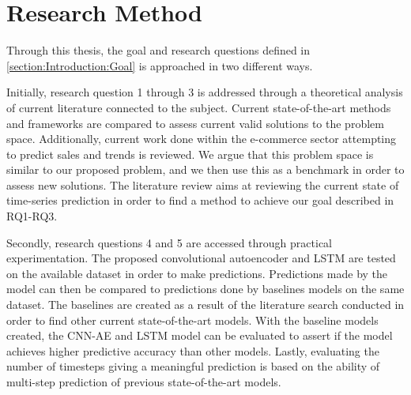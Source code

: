 \section{Research Method}
\label{section:Introduction:research-method}

Through this thesis, the goal and research questions defined in \autoref{section:Introduction:Goal} is approached in two different ways.

Initially, research question 1 through 3 is addressed through a theoretical analysis of current literature connected to the subject.
Current state-of-the-art methods and frameworks are compared to assess current valid solutions to the problem space.
Additionally, current work done within the e-commerce sector attempting to predict sales and trends is reviewed.
We argue that this problem space is similar to our proposed problem, and we then use this as a benchmark in order to assess new solutions.
The literature review aims at reviewing the current state of time-series prediction in order to find a method to achieve our goal described in RQ1-RQ3.

Secondly, research questions 4 and 5 are accessed through practical experimentation.
The proposed convolutional autoencoder and LSTM are tested on the available dataset in order to make predictions.
Predictions made by the model can then be compared to predictions done by baselines models on the same dataset.
The baselines are created as a result of the literature search conducted in order to find other current state-of-the-art models.
With the baseline models created, the CNN-AE and LSTM model can be evaluated to assert if the model achieves higher predictive accuracy than other models.
Lastly, evaluating the number of timesteps giving a meaningful prediction is based on the ability of multi-step prediction of previous state-of-the-art models.



\iffalse
This paper approaches the goal and research questions through theoretical analysis
of the problem space.
Primarily the focus of this paper is to conduct a review and analysis of current literature.
Reviewing the current state-of-the-art methods for predictive analysis of time-series,
as well as new experimental methods and frameworks.
Additionally, we review the current work done within the E-commerce sector attempting to predict sales and trends.
We argue that this problem space is similar to our proposed problem, and we thus use this as a benchmark in order to assess new solutions.
The literature review aims at reviewing the current state of time-series prediction,
in order to best find a method to achieve our goal described above.
\fi


